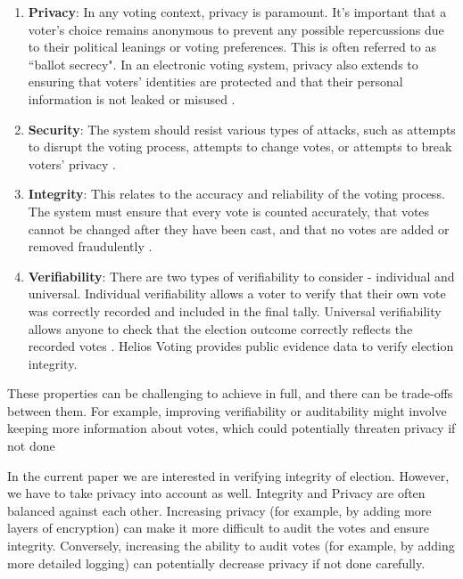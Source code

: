 \begin{enumerate}
\item \textbf{Privacy}: In any voting context, privacy is paramount. It's important that a voter's choice remains anonymous to prevent any possible repercussions due to their political leanings or voting preferences. This is often referred to as ``ballot secrecy". In an electronic voting system, privacy also extends to ensuring that voters' identities are protected and that their personal information is not leaked or misused \cite{cranor2005security}.

\item \textbf{Security}: The system should resist various types of attacks, such as attempts to disrupt the voting process, attempts to change votes, or attempts to break voters' privacy \cite{cranor2005security}.

\item \textbf{Integrity}: This relates to the accuracy and reliability of the voting process. The system must ensure that every vote is counted accurately, that votes cannot be changed after they have been cast, and that no votes are added or removed fraudulently \cite{ryan2009modelling}.

\item \textbf{Verifiability}: There are two types of verifiability to consider - individual and universal. Individual verifiability allows a voter to verify that their own vote was correctly recorded and included in the final tally. Universal verifiability allows anyone to check that the election outcome correctly reflects the recorded votes \cite{ryan2009modelling}. Helios Voting provides public evidence data to verify election integrity.
\end{enumerate}

These properties can be challenging to achieve in full, and there can be trade-offs between them. For example, improving verifiability or auditability might involve keeping more information about votes, which could potentially threaten privacy if not done

In the current paper we are interested in verifying integrity of election. However, we have to take privacy into account as well. Integrity and Privacy are often balanced against each other. Increasing privacy (for example, by adding more layers of encryption) can make it more difficult to audit the votes and ensure integrity. Conversely, increasing the ability to audit votes (for example, by adding more detailed logging) can potentially decrease privacy if not done carefully.


